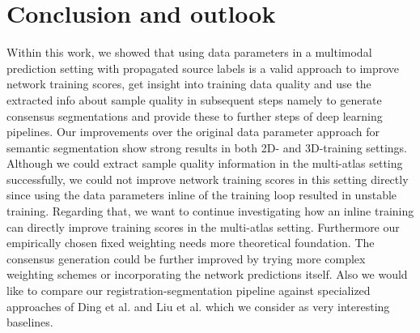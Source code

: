 \section{Conclusion and outlook}
    \label{sec:conclusion}
    Within this work, we showed that using data parameters in a multimodal prediction setting with propagated source labels is a valid approach to improve network training scores, get insight into training data quality and use the extracted info about sample quality in subsequent steps namely to generate consensus segmentations and provide these to further steps of deep learning pipelines. Our improvements over the original data parameter approach for semantic segmentation show strong results in both 2D- and 3D-training settings. Although we could extract sample quality information in the multi-atlas setting successfully, we could not improve network training scores in this setting directly since using the data parameters inline of the training loop resulted in unstable training.
    Regarding that, we want to continue investigating how an inline training can directly improve training scores in the multi-atlas setting. Furthermore our empirically chosen fixed weighting needs more theoretical foundation. The consensus generation could be further improved by trying more complex weighting schemes or incorporating the network predictions itself. Also we would like to compare our registration-segmentation pipeline against specialized approaches of Ding et al. and Liu et al. \cite{ding2019votenet,ding2020votenet+,liu2021style} which we consider as very interesting baselines.
